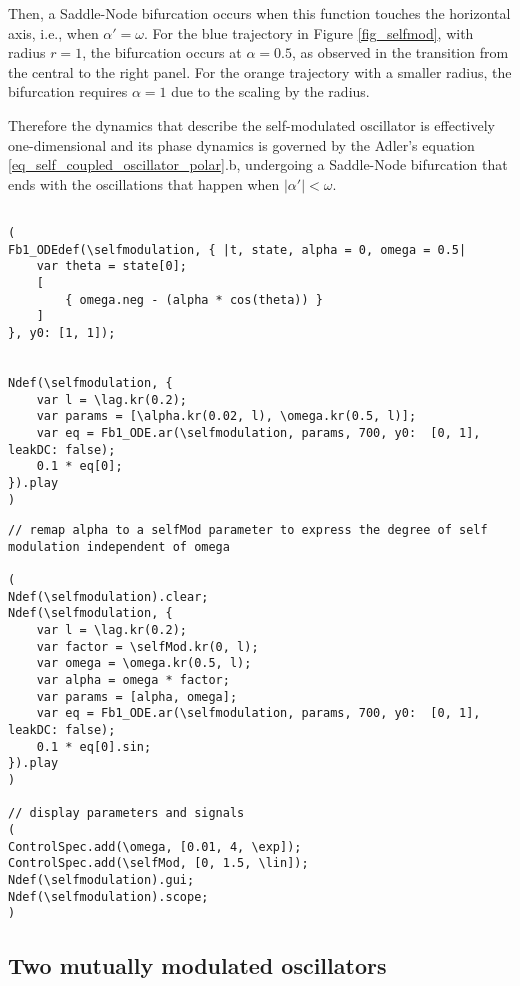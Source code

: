 \documentclass{article}
\begin{document}
Then, a Saddle-Node bifurcation occurs when this function touches the horizontal axis, i.e., when $\alpha' = \omega$. For the blue trajectory in Figure \ref{fig_selfmod}, with radius $r = 1$, the bifurcation occurs at $\alpha = 0.5$, as observed in the transition from the central to the right panel. For the orange trajectory with a smaller radius, the bifurcation requires $\alpha = 1$ due to the scaling by the radius.

Therefore the dynamics that describe the self-modulated oscillator is effectively one-dimensional and its phase dynamics is governed by the Adler's equation \ref{eq_self_coupled_oscillator_polar}.b, undergoing a Saddle-Node bifurcation that ends with the oscillations that happen when $|\alpha'|<\omega$.

\begin{lstlisting}[caption=Reformulation of the simple self-coupled oscillator in polar coordinates.]

(
Fb1_ODEdef(\selfmodulation, { |t, state, alpha = 0, omega = 0.5|
	var theta = state[0];
	[
		{ omega.neg - (alpha * cos(theta)) }
	]
}, y0: [1, 1]);


Ndef(\selfmodulation, {
	var l = \lag.kr(0.2);
	var params = [\alpha.kr(0.02, l), \omega.kr(0.5, l)];
	var eq = Fb1_ODE.ar(\selfmodulation, params, 700, y0:  [0, 1], leakDC: false);
	0.1 * eq[0];
}).play
)

\end{lstlisting}


\begin{lstlisting}[caption=The simple self-coupled oscillator in polar coordinates with a remapped $\alpha$.]
// remap alpha to a selfMod parameter to express the degree of self modulation independent of omega

(
Ndef(\selfmodulation).clear;
Ndef(\selfmodulation, {
	var l = \lag.kr(0.2);
	var factor = \selfMod.kr(0, l);
	var omega = \omega.kr(0.5, l);
	var alpha = omega * factor;
	var params = [alpha, omega];
	var eq = Fb1_ODE.ar(\selfmodulation, params, 700, y0:  [0, 1], leakDC: false);
	0.1 * eq[0].sin;
}).play
)

// display parameters and signals
(
ControlSpec.add(\omega, [0.01, 4, \exp]);
ControlSpec.add(\selfMod, [0, 1.5, \lin]);
Ndef(\selfmodulation).gui;
Ndef(\selfmodulation).scope;
)
\end{lstlisting}


\subsection{Two mutually modulated oscillators}
\end{document}
